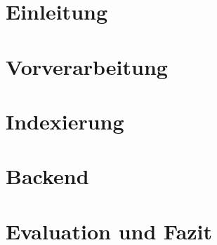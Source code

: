 




\pagestyle{empty} %



\pagestyle{useheadings} %
\setcounter{tocdepth}{3}    %
\setcounter{secnumdepth}{3} %

\tableofcontents %









\chapter{Einleitung}\label{ch:intro}


\chapter{Vorverarbeitung}\label{ch:prepros}


\chapter{Indexierung}\label{ch:indexing}


\chapter{Backend}\label{ch:backend}


\chapter{Evaluation und Fazit}\label{ch:results}





%

\newpage
\appendix





